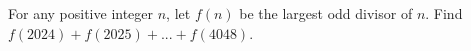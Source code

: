 For any positive integer $n$, let $f(n)$ be the largest odd divisor of $n$. Find $f(2024) + f(2025) +. . . + f(4048)$.
